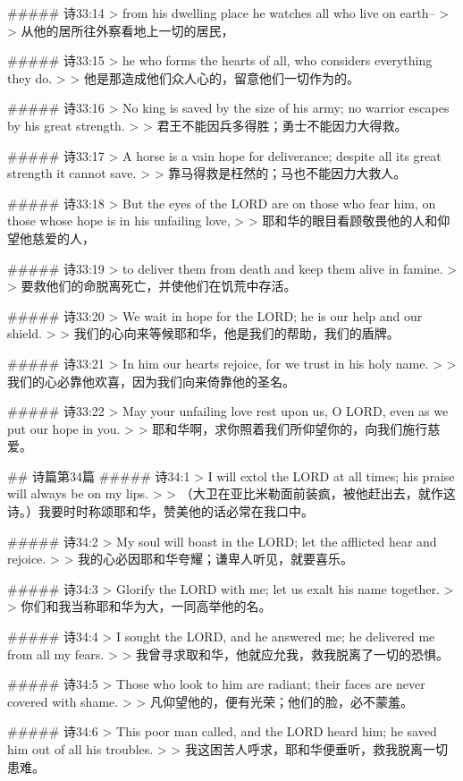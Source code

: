 ##### 诗33:14
> from his dwelling place he watches all who live on earth--
>
> 从他的居所往外察看地上一切的居民，


##### 诗33:15
> he who forms the hearts of all, who considers everything they do.
>
> 他是那造成他们众人心的，留意他们一切作为的。


##### 诗33:16
> No king is saved by the size of his army; no warrior escapes by his great strength.
>
> 君王不能因兵多得胜；勇士不能因力大得救。


##### 诗33:17
> A horse is a vain hope for deliverance; despite all its great strength it cannot save.
>
> 靠马得救是枉然的；马也不能因力大救人。


##### 诗33:18
> But the eyes of the LORD are on those who fear him, on those whose hope is in his unfailing love,
>
> 耶和华的眼目看顾敬畏他的人和仰望他慈爱的人，


##### 诗33:19
> to deliver them from death and keep them alive in famine.
>
> 要救他们的命脱离死亡，并使他们在饥荒中存活。


##### 诗33:20
> We wait in hope for the LORD; he is our help and our shield.
>
> 我们的心向来等候耶和华，他是我们的帮助，我们的盾牌。


##### 诗33:21
> In him our hearts rejoice, for we trust in his holy name.
>
> 我们的心必靠他欢喜，因为我们向来倚靠他的圣名。


##### 诗33:22
> May your unfailing love rest upon us, O LORD, even as we put our hope in you.
>
> 耶和华啊，求你照着我们所仰望你的，向我们施行慈爱。


## 诗篇第34篇
##### 诗34:1
> I will extol the LORD at all times; his praise will always be on my lips.
>
> （大卫在亚比米勒面前装疯，被他赶出去，就作这诗。）我要时时称颂耶和华，赞美他的话必常在我口中。


##### 诗34:2
> My soul will boast in the LORD; let the afflicted hear and rejoice.
>
> 我的心必因耶和华夸耀；谦卑人听见，就要喜乐。


##### 诗34:3
> Glorify the LORD with me; let us exalt his name together.
>
> 你们和我当称耶和华为大，一同高举他的名。


##### 诗34:4
> I sought the LORD, and he answered me; he delivered me from all my fears.
>
> 我曾寻求取和华，他就应允我，救我脱离了一切的恐惧。


##### 诗34:5
> Those who look to him are radiant; their faces are never covered with shame.
>
> 凡仰望他的，便有光荣；他们的脸，必不蒙羞。


##### 诗34:6
> This poor man called, and the LORD heard him; he saved him out of all his troubles.
>
> 我这困苦人呼求，耶和华便垂听，救我脱离一切患难。


